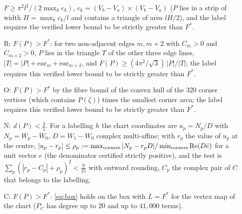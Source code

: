 \documentclass[11pt]{article}
\theoremstyle{remark}
\begin{document}
\begin{itemize}
$F\ge\pi^2l^2/(2\max_kc_k)$, $c_k=(V_b-V_a)\times(V_k-V_a)$ ($P$ lies in a strip of width $H=\max_kc_k/l$ and contains a
triangle of area $lH/2$), and the label requires the verified lower bound to be strictly greater than $F^*$.
\item[R:] $F(P)>F^*$: for two non-adjacent edges $m,m+2$ with $C_m>0$ and $C_{m+2}>0$, $P$ lies in the triangle $T$ of the other three
edge lines, $|T|=|P|+\mathrm{ear}_m+\mathrm{ear}_{m+2}$, and $F(P)\ge(4\pi^2/\sqrt3)\,|P|/|T|$; the label requires this
verified lower bound to be strictly greater than $F^*$.
\item[O:] $F(P)>F^*$ by the fibre bound of the convex hull of the $320$ corner vertices (which contains $P(\zeta)$)
times the smallest corner area; the label requires this verified lower bound to be strictly greater than $F^*$.
\item[N:] $d(P)<\frac35$. For a labelling $h$ the chart coordinates are $u_p=N_p/D$ with $N_p=W_p-W_0$, $D=W_1-W_0$
complex multi-affine; with $r_p$ the value of $u_p$ at the centre, $|u_p-r_p|\le\rho_p:=\max_{\rm corners}|N_p-r_pD|/
\min_{\rm corners}\mathrm{Re}(D\bar e)$ for a unit vector $e$ (the denominator certified strictly positive), and the test
is $\sum_p(|r_p-C_p|+\rho_p)^2<\frac9{25}$ with outward rounding, $C_p$ the complex pair of $C$ that belongs to the
labelling.
\item[C:] $F(P)>F^*$: \eqref{eq:box} holds on the box with $L=F^*$ for the vertex map of the chart ($P_C$ has degree
up to $20$ and up to $41{,}000$ terms).
\end{itemize}
\end{document}
